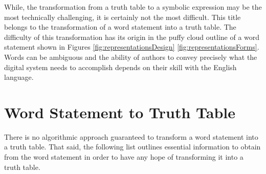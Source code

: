 While, the transformation from a truth table to a symbolic expression
may be the most technically challenging, it is certainly not the
most difficult.  This title belongs to the transformation of a word
statement into a truth table.  The difficulty of this transformation
has its origin in the puffy cloud outline of a word statement shown in
Figures \ref{fig:representationsDesign}  \ref{fig:representationsForms}. Words can be ambiguous and 
the ability of authors to convey precisely what the digital system
needs to accomplish depends on their skill with the English language.

\section{Word Statement to Truth Table}
There is no algorithmic approach guaranteed to transform a word statement 
into a truth table.  That said, the following list outlines essential
information to obtain from the word statement in order to
have any hope of transforming it into a truth table.



